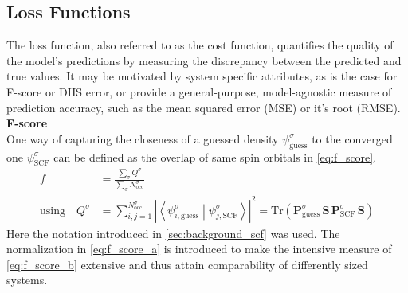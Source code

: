 \subsection{Loss Functions}
\label{subsec:background_loss_function}
The loss function, also referred to as the cost function, quantifies the quality of the model's predictions by measuring the discrepancy between the predicted and true values. It may be motivated by system specific attributes, as is the case for F-score or DIIS error, or provide a general-purpose, model-agnostic measure of prediction accuracy, such as the mean squared error (MSE) or it's root (RMSE). \\

\textbf{F-score}\\
One way of capturing the closeness of a guessed density $\psi^\sigma_{\text{guess}}$ to the converged one $\psi^\sigma_{\text{SCF}}$ can be defined as the overlap of same spin orbitals in \autoref{eq:f_score}.
\begin{subequations}
\label{eq:f_score}
\begin{align}
    f &= \frac{\sum\limits_\sigma Q^\sigma}{\sum\limits_\sigma N^\sigma_\text{occ}} \label{eq:f_score_a}\\
    \text{using} \quad Q^\sigma &= \sum_{i,j=1}^{N^\sigma_\text{occ}} \left| \left\langle \psi^\sigma_{i,\text{guess}} \middle| \psi^\sigma_{j,\text{SCF}} \right\rangle \right|^2 = \mathrm{Tr}\left( \mathbf{P}^{\sigma}_\text{guess} \, \mathbf{S} \, \mathbf{P}^{\sigma}_\text{SCF} \, \mathbf{S} \right)  \label{eq:f_score_b}
\end{align}
\end{subequations}
Here the notation introduced in \autoref{sec:background_scf} was used. The normalization in \autoref{eq:f_score_a} is introduced to make the intensive measure of \autoref{eq:f_score_b} extensive and thus attain comparability of differently sized systems.



